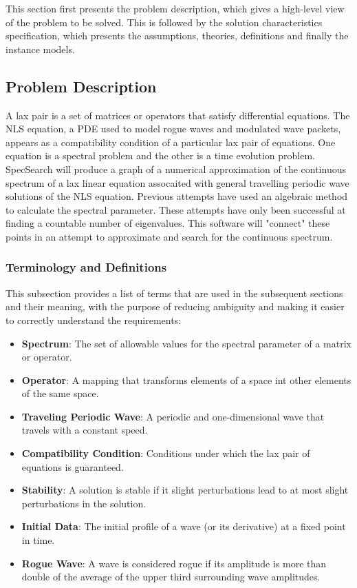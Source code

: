 \documentclass[12pt]{article}
\begin{document}
This section first presents the problem description, which gives a high-level
view of the problem to be solved.  This is followed by the solution 
characteristics specification, which presents the assumptions, theories, 
definitions and finally the instance models. 

\subsection{Problem Description} \label{Sec_pd}
A lax pair is a set of matrices or operators that satisfy differential 
equations. The NLS equation, a PDE used to model rogue waves and modulated wave 
packets, appears as a compatibility condition of a particular lax pair of 
equations. One equation is a spectral problem and the other is a time 
evolution problem.  \\

SpecSearch will produce a graph of a numerical approximation of the continuous 
spectrum of a lax linear equation assocaited with general travelling periodic 
wave solutions of the NLS equation. Previous attempts have used an algebraic 
method to calculate the spectral parameter. These attempts have only been 
successful at finding a countable number of eigenvalues. This software will 
"connect" these points in an attempt to approximate and search for the 
continuous spectrum. \\ 

\subsubsection{Terminology and  Definitions}

This subsection provides a list of terms that are used in the subsequent
sections and their meaning, with the purpose of reducing ambiguity and making it
easier to correctly understand the requirements:

\begin{itemize}

\item \textbf{Spectrum}: The set of allowable values for the spectral parameter 
of a matrix or operator.
\item \textbf{Operator}: A mapping that transforms elements of a space int 
other elements of the same space. 
\item \textbf{Traveling Periodic Wave}: A periodic and one-dimensional wave 
that travels with a constant speed. 
\item \textbf{Compatibility Condition}: Conditions under which the lax pair of 
equations is guaranteed. 
\item \textbf{Stability}: A solution is stable if it slight perturbations lead 
to at most slight perturbations in the solution.
\item \textbf{Initial Data}: The initial profile of a wave (or its derivative) 
at a fixed point in time.
\item \textbf{Rogue Wave}: A wave is considered rogue if its amplitude is more 
than double of the average of the upper third surrounding wave amplitudes.

\end{itemize}
\end{document}
